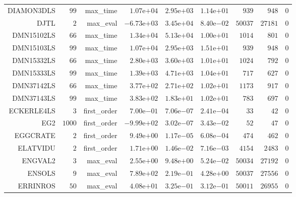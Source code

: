 \begin{longtable}{rrrrrrrrr}
DIAMON3DLS & \(    99\) & max\_time & \( 1.07\)e\(+04\) & \( 2.95\)e\(+03\) & \( 1.14\)e\(+01\) & \(   939\) & \(   948\) & \(     0\) \\
DJTL & \(     2\) & max\_eval & \(-6.73\)e\(+03\) & \( 3.45\)e\(+04\) & \( 8.40\)e\(-02\) & \( 50037\) & \( 27181\) & \(     0\) \\
DMN15102LS & \(    66\) & max\_time & \( 1.34\)e\(+04\) & \( 5.13\)e\(+04\) & \( 1.00\)e\(+01\) & \(  1014\) & \(   801\) & \(     0\) \\
DMN15103LS & \(    99\) & max\_time & \( 1.07\)e\(+04\) & \( 2.95\)e\(+03\) & \( 1.51\)e\(+01\) & \(   939\) & \(   948\) & \(     0\) \\
DMN15332LS & \(    66\) & max\_time & \( 2.80\)e\(+03\) & \( 3.60\)e\(+03\) & \( 1.01\)e\(+01\) & \(  1024\) & \(   792\) & \(     0\) \\
DMN15333LS & \(    99\) & max\_time & \( 1.39\)e\(+03\) & \( 4.71\)e\(+03\) & \( 1.04\)e\(+01\) & \(   717\) & \(   627\) & \(     0\) \\
DMN37142LS & \(    66\) & max\_time & \( 3.77\)e\(+02\) & \( 2.71\)e\(+02\) & \( 1.02\)e\(+01\) & \(  1173\) & \(   917\) & \(     0\) \\
DMN37143LS & \(    99\) & max\_time & \( 3.83\)e\(+02\) & \( 1.83\)e\(+01\) & \( 1.02\)e\(+01\) & \(   783\) & \(   697\) & \(     0\) \\
ECKERLE4LS & \(     3\) & first\_order & \( 7.00\)e\(-01\) & \( 7.06\)e\(-07\) & \( 2.41\)e\(-04\) & \(    33\) & \(    42\) & \(     0\) \\
EG2 & \(  1000\) & first\_order & \(-9.99\)e\(+02\) & \( 3.02\)e\(-07\) & \( 3.43\)e\(-02\) & \(    52\) & \(    47\) & \(     0\) \\
EGGCRATE & \(     2\) & first\_order & \( 9.49\)e\(+00\) & \( 1.17\)e\(-05\) & \( 6.08\)e\(-04\) & \(   474\) & \(   462\) & \(     0\) \\
ELATVIDU & \(     2\) & first\_order & \( 1.71\)e\(+00\) & \( 1.46\)e\(-02\) & \( 7.16\)e\(-03\) & \(  4154\) & \(  2483\) & \(     0\) \\
ENGVAL2 & \(     3\) & max\_eval & \( 2.55\)e\(+00\) & \( 9.48\)e\(+00\) & \( 5.24\)e\(-02\) & \( 50034\) & \( 27192\) & \(     0\) \\
ENSOLS & \(     9\) & max\_eval & \( 7.89\)e\(+02\) & \( 2.19\)e\(-01\) & \( 4.28\)e\(+00\) & \( 50037\) & \( 27556\) & \(     0\) \\
ERRINROS & \(    50\) & max\_eval & \( 4.08\)e\(+01\) & \( 3.25\)e\(-01\) & \( 3.12\)e\(-01\) & \( 50011\) & \( 26955\) & \(     0\) \\

\end{longtable}
